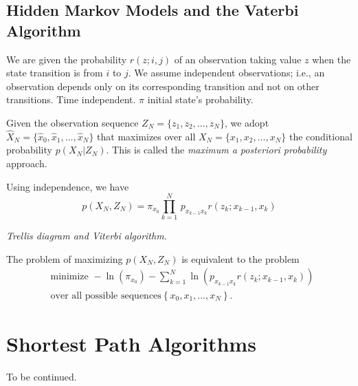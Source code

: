 \subsection{Hidden Markov Models and the Vaterbi Algorithm}
We are given the probability $r(z;i,j)$ of an observation taking value $z$ when the state transition is from $i$ to $j$. We assume independent observations; i.e., an observation depends only on its corresponding transition and not on other transitions. Time independent. $\pi$ initial state's probability. 

Given the observation sequence $Z_N=\{z_1,z_2,\dots,z_N\}$, we adopt $\hat{X}_N=\{\hat{x}_0,\hat{x}_1,\dots,\hat{x}_N\}$ that maximizes over all $X_N=\{x_1,x_2,\dots,x_N\}$ the conditional probability $p(X_N|Z_N)$. This is called the \textit{maximum a posteriori probability} approach.

Using independence, we have 
\begin{equation}
    p(X_N,Z_N) =\pi_{x_0}\prod_{k = 1}^N\, p_{x_{k - 1}x_k} r(z_k;x_{k - 1},x_k)
\end{equation}

\textit{Trellis diagram and Viterbi algorithm.}

The problem of maximizing $p(X_N,Z_N)$ is equivalent to the problem 
\begin{align*}
    &\text{minimize }-\ln \left(\pi_{x_0}\right)-\sum_{k=1}^N \ln
    \left(p_{x_{k-1} x_k} r\left(z_k ; x_{k-1}, x_k\right)\right)\, \\
    &\text{over all possible sequences} \left\{x_0, x_1, \ldots, x_N\right\}.
\end{align*}

\section{Shortest Path Algorithms}
 To be continued.
 